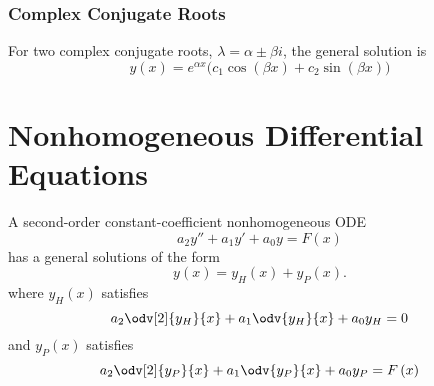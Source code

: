 \documentclass{article}
\begin{document}
\subsubsection{Complex Conjugate Roots}
For two complex conjugate roots, \(\lambda = \alpha \pm \beta i\), the
general solution is
\begin{equation*}
    y\left( x \right) = e^{\alpha x}\bigl( c_1\cos{\left( \beta x \right)} + c_2 \sin{\left( \beta x \right)} \bigr)
\end{equation*}
\section{Nonhomogeneous Differential Equations}
A second-order constant-coefficient nonhomogeneous ODE
\begin{equation*}
    a_2y'' + a_1y' + a_0y = F\left( x \right)
\end{equation*}
has a general solutions of the form
\begin{equation*}
    y\left( x \right) = y_H\left( x \right) + y_P\left( x \right).
\end{equation*}
where \(y_H\left( x \right)\) satisfies
\begin{equation*}
    a_2\odv[2]{y_H}{x} + a_1\odv{y_H}{x} + a_0y_H = 0
\end{equation*}
and \(y_P\left( x \right)\) satisfies
\begin{equation*}
    a_2\odv[2]{y_P}{x} + a_1\odv{y_P}{x} + a_0y_P = F\left( x \right)
\end{equation*}
\end{document}
